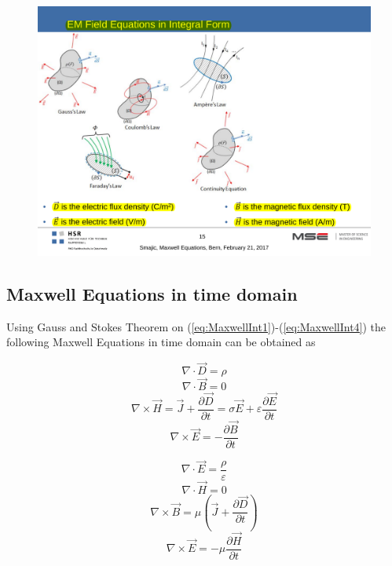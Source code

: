\begin{figure}[h!]
	\centering
	\includegraphics[width=.7\textwidth]{./images/MaxwellEqImages.pdf}
\end{figure}

\subsection{Maxwell Equations in time domain}
Using Gauss and Stokes Theorem on (\ref{eq:MaxwellInt1})-(\ref{eq:MaxwellInt4}) the following Maxwell Equations in time domain can be obtained as 

\begin{multicols}{2}
	\begin{equation}
		\nabla \cdot \vec{D} = \rho
		\label{eq:MaxwellDiff1_1}
	\end{equation}
	\begin{equation}
		\nabla \cdot \vec{B} = 0
		\label{eq:MaxwellDiff1_2}
	\end{equation}
	\begin{equation}
		\nabla \times \vec{H} = \vec{J} + \frac{\partial \vec{D}}{\partial t} = \sigma \vec{E} + \varepsilon \frac{\partial \vec{E}}{\partial t}
		\label{eq:MaxwellDiff1_3}
	\end{equation}
	\begin{equation}
		\nabla \times \vec{E} = - \frac{\partial \vec{B}}{\partial t}
		\label{eq:MaxwellDiff1_4}
	\end{equation}
	
	\begin{equation}
		\nabla \cdot \vec{E} = \frac{\rho}{\varepsilon}
		\label{eq:MaxwellDiff2_1}
	\end{equation}
	\begin{equation}
		\nabla \cdot \vec{H} = 0
		\label{eq:MaxwellDiff2_2}
	\end{equation}
	\begin{equation}
		\nabla \times \vec{B} = \mu\left(\vec{J} + \frac{\partial \vec{D}}{\partial t}\right)
		\label{eq:MaxwellDiff2_3}
	\end{equation}
	\begin{equation}
		\nabla \times \vec{E} = -\mu \frac{\partial \vec{H}}{\partial t}
		\label{eq:MaxwellDiff2_4}
	\end{equation}
\end{multicols}

